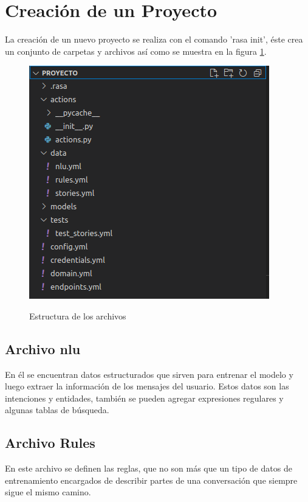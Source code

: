 \section{Creación de un Proyecto}
\indent La creación de un nuevo proyecto se realiza con el comando 'rasa init', éste crea un
conjunto de carpetas y archivos así como se muestra en la figura \ref{fig:Estructura}.
\begin{figure}[h]
	\centering
	\includegraphics[width=\textwidth]{imagenes/cap3/4_Estructura del Proyecto.png}
	\caption{Estructura de los archivos}
	\label{fig:Estructura}
	\cite{Rasa}
\end{figure}
\subsection{Archivo nlu}
En él se encuentran datos estructurados que sirven para entrenar el modelo y luego extraer la
información de los mensajes del usuario. Estos datos son  las intenciones y entidades, también se
pueden agregar expresiones regulares y algunas tablas de búsqueda. \cite{NLU_Documentation}

\subsection{Archivo Rules}
En este archivo se definen las reglas, que no son más que un tipo de datos de entrenamiento
encargados de describir partes de una conversación que siempre sigue el mismo
camino.\cite{Rules_Documentation}

